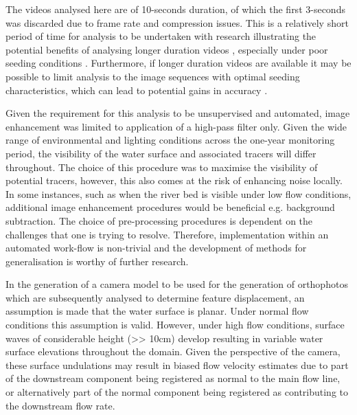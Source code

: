 \documentclass[hess, manuscript]{copernicus}
\begin{document}
The videos analysed here are of 10-seconds duration, of which the first 3-seconds was discarded due to frame rate and compression issues. This is a relatively short period of time for analysis to be undertaken with research illustrating the potential benefits of analysing longer duration videos \citep{pumo2021optical}, especially under poor seeding conditions \citep{dal2018exploring}. Furthermore, if longer duration videos are available it may be possible to limit analysis to the image sequences with optimal seeding characteristics, which can lead to potential gains in accuracy \citep{pizarro2020refining, pizarro2020}.

Given the requirement for this analysis to be unsupervised and automated, image enhancement was limited to application of a high-pass filter only. Given the wide range of environmental and lighting conditions across the one-year monitoring period, the visibility of the water surface and associated tracers will differ throughout. The choice of this procedure was to maximise the visibility of potential tracers, however, this also comes at the risk of enhancing noise locally. In some instances, such as when the river bed is visible under low flow conditions, additional image enhancement procedures would be beneficial e.g. background subtraction. The choice of pre-processing procedures is dependent on the challenges that one is trying to resolve. Therefore, implementation within an automated work-flow is non-trivial and the development of methods for generalisation is worthy of further research.

In the generation of a camera model to be used for the generation of orthophotos which are subsequently analysed to determine feature displacement, an assumption is made that the water surface is planar. Under normal flow conditions this assumption is valid. However, under high flow conditions, surface waves of considerable height (>> 10cm) develop resulting in variable water surface elevations throughout the domain. Given the perspective of the camera, these surface undulations may result in biased flow velocity estimates due to part of the downstream component being registered as normal to the main flow line, or alternatively part of the normal component being registered as contributing to the downstream flow rate.
\end{document}

